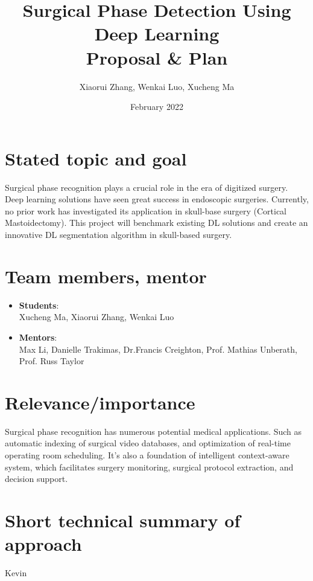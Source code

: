 \documentclass[11pt]{article} \usepackage[top=1in, bottom=1in, left=1in, right=1in]{geometry}
\title{Surgical Phase Detection Using Deep Learning\\ Proposal \& Plan}
\author{Xiaorui Zhang, Wenkai Luo, Xucheng Ma}
\date{February 2022}
\begin{document}
\maketitle

\section{Stated topic and goal}
Surgical phase recognition plays a crucial role in the era of digitized surgery. Deep learning solutions have seen great success in endoscopic surgeries. Currently, no prior work has investigated its application in skull-base surgery (Cortical Mastoidectomy). This project will benchmark existing DL solutions and create an innovative DL segmentation algorithm in skull-based surgery.

\section{Team members, mentor}
\begin{itemize}
    \item \textbf{Students}:\\Xucheng Ma, Xiaorui Zhang, Wenkai Luo
    \item \textbf{Mentors}:\\Max Li, Danielle Trakimas, Dr.Francis Creighton, Prof. Mathias Unberath, Prof. Russ Taylor
\end{itemize}

\section{Relevance/importance}
Surgical phase recognition has numerous potential medical applications. Such as automatic indexing of surgical video databases, and optimization of real-time operating room scheduling. It’s also a foundation of intelligent context-aware system, which facilitates surgery monitoring, surgical protocol extraction, and decision support.
\section{Short technical summary of approach}
Kevin
\end{document}
